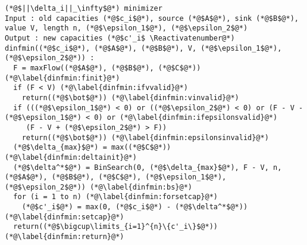 {}
\Suppressnumber
\begin{lstlisting}[label=dinf, style=numbers]
(*@$||\delta_i||_\infty$@*) minimizer
Input : old capacities (*@$c_i$@*), source (*@$A$@*), sink (*@$B$@*), value V, length n, (*@$\epsilon_1$@*), (*@$\epsilon_2$@*)
Output : new capacities (*@$c'_i$ \Reactivatenumber@*)
dinfmin((*@$c_i$@*), (*@$A$@*), (*@$B$@*), V, (*@$\epsilon_1$@*), (*@$\epsilon_2$@*)) :
  F = maxFlow((*@$A$@*), (*@$B$@*), (*@$C$@*)) (*@\label{dinfmin:finit}@*)
  if (F < V) (*@\label{dinfmin:ifvvalid}@*)
    return((*@$\bot$@*)) (*@\label{dinfmin:vinvalid}@*)
  if (((*@$\epsilon_1$@*) < 0) or ((*@$\epsilon_2$@*) < 0) or (F - V - (*@$\epsilon_1$@*) < 0) or (*@\label{dinfmin:ifepsilonsvalid}@*)
     (F - V + (*@$\epsilon_2$@*) > F))
    return((*@$\bot$@*)) (*@\label{dinfmin:epsilonsinvalid}@*)
  (*@$\delta_{max}$@*) = max((*@$C$@*)) (*@\label{dinfmin:deltainit}@*)
  (*@$\delta^*$@*) = BinSearch(0, (*@$\delta_{max}$@*), F - V, n, (*@$A$@*), (*@$B$@*), (*@$C$@*), (*@$\epsilon_1$@*), (*@$\epsilon_2$@*)) (*@\label{dinfmin:bs}@*)
  for (i = 1 to n) (*@\label{dinfmin:forsetcap}@*)
    (*@$c'_i$@*) = max(0, (*@$c_i$@*) - (*@$\delta^*$@*)) (*@\label{dinfmin:setcap}@*)
  return((*@$\bigcup\limits_{i=1}^{n}\{c'_i\}$@*)) (*@\label{dinfmin:return}@*)
\end{lstlisting}
